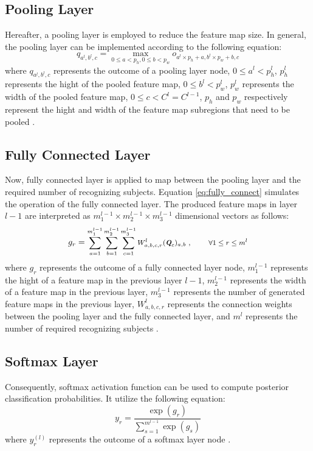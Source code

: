 \documentclass[conference]{IEEEtran}
\begin{document}
\subsection{Pooling Layer}
Hereafter, a pooling layer is employed to reduce the feature map size. In general, the pooling layer can be implemented according to the following equation:
\begin{equation}
q_{a^{l},b^{l},c}=\underset{0\leq a<p_h,0\leq b<p_w}{\max} o_{a^{l}\times p_h+a, b^{l}\times p_w+b,c}
\label{eq:pooling_layer}
\end{equation}
where $q_{a^{l},b^{l},c}$ represents the outcome of a pooling layer node, $0\leq a^{l} <p_h^{l}$, $p_h^{l}$ represents the hight of the pooled feature map, $0\leq b^{l} <p_w^{l}$, $p_w^{l}$ represents the width of the pooled feature map, $0\leq c <C^{l}=C^{l-1}$, $p_h$ and $p_w$ respectively represent the hight and width of the feature map subregions that need to be pooled \cite{wu2017introduction}. 

\subsection{Fully Connected Layer}
Now, fully connected layer is applied to map between the pooling layer and the required number of recognizing subjects. Equation \ref{eq:fully_connect} simulates the operation of the fully connected layer. The produced feature maps in layer $l-1$ are interpreted as $m_1^{l-1} \times m_2^{l-1} \times m_3^{l-1}$ dimensional vectors as follows:
\begin{equation}
g_{r}=\text{\footnotesize $\sum_{a=1}^{m_1^{l-1}} \sum_{b=1}^{m_2^{l-1}} \sum_{c=1}^{m_3^{l-1}} W_{a,b,c,r}^{l}(\textit{\textbf{Q}}_{c})_{a,b}~, ~~~~~~~\forall 1 \leq r \leq m^{l}$}
\label{eq:fully_connect}
\end{equation}
where $g_{r}$ represents the outcome of a fully connected layer node, $m_1^{l-1}$ represents the hight of a feature map in the previous layer $l-1$, $m_2^{l-1}$ represents the width of a feature map in the previous layer, $m_3^{l-1}$ represents the number of generated feature maps in the previous layer, $W_{a,b,c,r}^{l}$ represents the connection weights between the pooling layer and the fully connected layer, and $m^{l}$ represents the number of required recognizing subjects \cite{stutz2014neural}.\\

\subsection{Softmax Layer}
Consequently, softmax activation function can be used to compute posterior classification probabilities. It utilize the following equation:
\begin{equation}
y_{r}=\frac{\exp(g_{r})}{\sum_{s=1}^{m^{l-1}}\exp(g_{s})} 
\label{eq:softmax}
\end{equation}
where $y_{r}^{(l)}$ represents the outcome of a softmax layer node \cite{stutz2014neural}.
\end{document}
